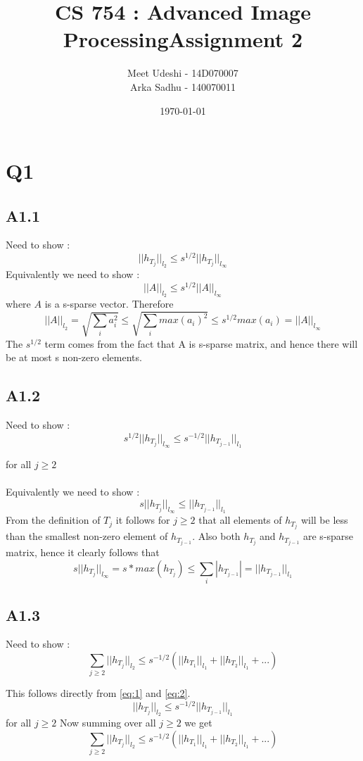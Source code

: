 \documentclass{article}
\title{CS 754 : Advanced Image ProcessingAssignment 2}
\author{Meet Udeshi - 14D070007\\
  Arka Sadhu - 140070011\\
}
\date{\today}
\newcommand{\lone}[1]{
  ||#1||_{l_1}
}
\newcommand{\ltwo}[1]{
  ||#1||_{l_2}
}
\newcommand{\linf}[1]{
  ||#1||_{l_\infty}
}
\newcommand{\htj}[1]{
  h_{T_{#1}}
}
\begin{document}
\maketitle
\section*{Q1}
\subsection*{A1.1}
Need to show :
\begin{equation}\label{eq:1}
  \ltwo{h_{T_j}} \le s^{1/2} \linf{h_{T_j}}
\end{equation}
Equivalently we need to show :
$$\ltwo{A} \le s^{1/2} \linf{A}$$
where $A$ is a s-sparse vector.
Therefore
$$\ltwo{A} = \sqrt{\sum_{i}a_i^2} \le \sqrt{\sum_i max(a_i)^2} \le s^{1/2}max(a_i) = \linf{A}$$
The $s^{1/2}$ term comes from the fact that A is s-sparse matrix, and hence there will be at most s non-zero elements.

\subsection*{A1.2}
Need to show :
\begin{equation}\label{eq:2}
  s^{1/2}\linf{h_{T_j}} \le s^{-1/2}\lone{\htj{j-1}}
\end{equation}

for all $j \ge 2$\\\\
Equivalently we need to show :
$$s\linf{\htj{j}} \le \lone{\htj{j-1}}$$
From the definition of $T_j$ it follows for $j \ge 2$ that all elements of $\htj{j}$ will be less than the smallest non-zero element of
$\htj{j-1}$. Also both $\htj{j}$ and $\htj{j-1}$ are s-sparse matrix, hence it clearly follows that
$$s \linf{\htj{j}} = s*max(\htj{j}) \le \sum_i |\htj{j-1}| = \lone{\htj{j-1}} $$

\subsection*{A1.3}
Need to show :
\begin{equation}\label{eq:3}
  \sum_{j \ge 2} \ltwo{\htj{j}} \le s^{-1/2}(\lone{\htj{1}} + \lone{\htj{2}} + ...)
\end{equation}

This follows directly from \ref{eq:1} and \ref{eq:2}.
$$\ltwo{\htj{j}} \le s^{-1/2} \lone{\htj{j-1}}$$
for all $j \ge 2$
Now summing over all $j \ge 2$ we get
$$\sum_{j \ge 2} \ltwo{\htj{j}} \le s^{-1/2}(\lone{\htj{1}} + \lone{\htj{2}} + ...)$$
\end{document}
